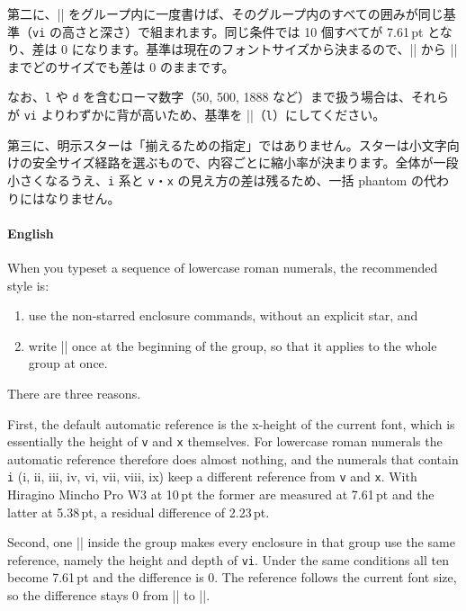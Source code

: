 \documentclass[luatex,fontsize=8pt,paper=b5,twoside]{jlreq}%
\begin{document}
第二に、\KKverb|| をグループ内に一度書けば、そのグループ内のすべての囲みが同じ基準（\verb|vi| の高さと深さ）で組まれます。同じ条件では 10 個すべてが 7.61\,pt となり、差は 0 になります。基準は現在のフォントサイズから決まるので、\KKverb|\tiny| から \KKverb|\Huge| までどのサイズでも差は 0 のままです。

なお、\verb|l| や \verb|d| を含むローマ数字（50, 500, 1888 など）まで扱う場合は、それらが \verb|vi| よりわずかに背が高いため、基準を \KKverb||（\verb|l|）にしてください。

第三に、明示スターは「揃えるための指定」ではありません。スターは小文字向けの安全サイズ経路を選ぶもので、内容ごとに縮小率が決まります。全体が一段小さくなるうえ、\verb|i| 系と \verb|v|・\verb|x| の見え方の差は残るため、一括 phantom の代わりにはなりません。

\paragraph{English}
When you typeset a sequence of lowercase roman numerals, the recommended style is:

\begin{enumerate}
  \item use the non-starred enclosure commands, without an explicit star, and
  \item write \KKverb|| once at the beginning of the group, so that it applies to the whole group at once.
\end{enumerate}

There are three reasons.

First, the default automatic reference is the x-height of the current font, which is essentially the height of \verb|v| and \verb|x| themselves. For lowercase roman numerals the automatic reference therefore does almost nothing, and the numerals that contain \verb|i| (i, ii, iii, iv, vi, vii, viii, ix) keep a different reference from \verb|v| and \verb|x|. With Hiragino Mincho Pro W3 at 10\,pt the former are measured at 7.61\,pt and the latter at 5.38\,pt, a residual difference of 2.23\,pt.

Second, one \KKverb|| inside the group makes every enclosure in that group use the same reference, namely the height and depth of \verb|vi|. Under the same conditions all ten become 7.61\,pt and the difference is 0. The reference follows the current font size, so the difference stays 0 from \KKverb|\tiny| to \KKverb|\Huge|.
\end{document}
